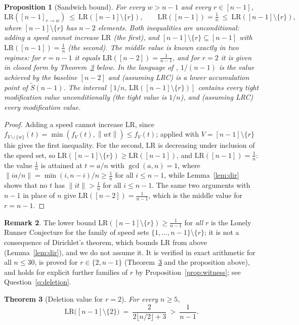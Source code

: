 \documentclass[11pt]{article}
\newtheorem{theorem}{Theorem}[section]
\newtheorem{proposition}[theorem]{Proposition}
\theoremstyle{definition}
\newtheorem{remark}[theorem]{Remark}
\newcommand{\LR}{\mathrm{LR}}
\newcommand{\norm}[1]{\left\lVert #1 \right\rVert}
\begin{document}
\begin{proposition}[Sandwich bound]\label{prop:sandwich}
For every $w>n-1$ and every $r\in[n-1]$,
\[
\LR([n-1]_{r\to w})\ \le\ \LR([n-1]\setminus\{r\}),
\qquad
\LR([n-1])=\tfrac1n\ \le\ \LR([n-1]\setminus\{r\}),
\]
where $[n-1]\setminus\{r\}$ has $n-2$ elements.  Both inequalities are
unconditional: adding a speed cannot increase $\LR$ (the first), and
$[n-1]\setminus\{r\}\subseteq[n-1]$ with $\LR([n-1])=\frac1n$ (the
second).  The middle value is known exactly in two regimes: for $r=n-1$
it equals $\LR([n-2])=\frac1{n-1}$, and for $r=2$ it is given in closed
form by Theorem~\ref{thm:r2closed} below.  In the language of
\cite{GiriKravitz2026}, $1/(n-1)$ is the value achieved by the baseline
$[n-2]$ and (assuming LRC) is a lower accumulation point of
$\widetilde{S}(n-1)$.  The interval $[1/n,\,\LR([n-1]\setminus\{r\})]$
contains every tight modification value unconditionally (the tight value
is $1/n$), and (assuming LRC) every modification value.
\end{proposition}

\begin{proof}
Adding a speed cannot increase $\LR$, since
$f_{V\cup\{w\}}(t)=\min(f_V(t),\norm{wt})\le f_V(t)$; applied with
$V=[n-1]\setminus\{r\}$ this gives the first inequality.  For the second,
$\LR$ is decreasing under inclusion of the speed set, so
$\LR([n-1]\setminus\{r\})\ge\LR([n-1])$, and
$\LR([n-1])=\frac1n$: the value $\frac1n$ is attained at $t=a/n$ with
$\gcd(a,n)=1$, where $\|ia/n\|=\min(i,n-i)/n\ge\frac1n$ for all
$i\le n-1$, while Lemma~\ref{lem:dir} shows that no $t$ has
$\|it\|>\frac1n$ for all $i\le n-1$.  The same two arguments with $n-1$
in place of $n$ give $\LR([n-2])=\frac1{n-1}$, which is the middle value
for $r=n-1$.
\end{proof}

\begin{remark}
The lower bound $\LR([n-1]\setminus\{r\})\ge\frac1{n-1}$ for \emph{all}
$r$ is the Lonely Runner Conjecture for the family of speed sets
$\{1,\dots,n-1\}\setminus\{r\}$; it is not a consequence of
Dirichlet's theorem, which bounds $\LR$ from above
(Lemma~\ref{lem:dir}), and we do not assume it.  It is verified in exact
arithmetic for all $n\le30$, is proved for $r\in\{2,n-1\}$
(Theorem~\ref{thm:r2closed} and the proposition above), and holds for
explicit further families of $r$ by Proposition~\ref{prop:witness}; see
Question~\ref{q:deletion}.
\end{remark}

\begin{theorem}[Deletion value for $r=2$]\label{thm:r2closed}
For every $n\ge5$,
\[
\LR\bigl([n-1]\setminus\{2\}\bigr)\ =\
\frac{2}{2\lfloor n/2\rfloor+3}\ >\ \frac{1}{n-1}.
\]
\end{theorem}
\end{document}
